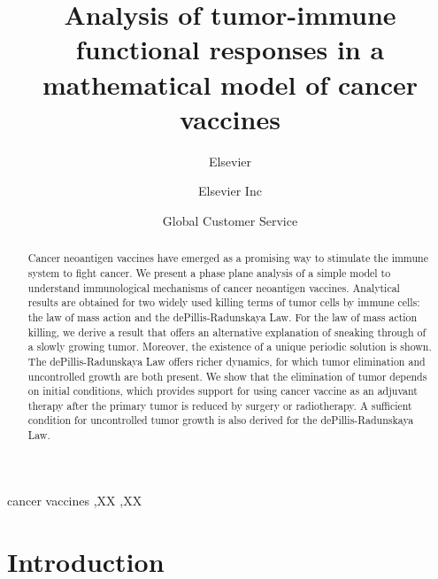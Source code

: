 \documentclass[review,authoryear]{elsarticle}
\begin{document}
\begin{frontmatter}

\title{Analysis of tumor-immune functional responses in a mathematical model
of cancer vaccines}


\author{Elsevier}
\address{Radarweg 29, Amsterdam}

\author[mymainaddress,mysecondaryaddress]{Elsevier Inc}

\author[mysecondaryaddress]{Global Customer Service}

\address[mymainaddress]{1600 John F Kennedy Boulevard, Philadelphia}
\address[mysecondaryaddress]{360 Park Avenue South, New York}

\begin{abstract}
Cancer neoantigen vaccines have emerged as a promising way to stimulate
the immune system to fight cancer. We present a phase plane analysis
of a simple model to understand immunological mechanisms of
cancer neoantigen vaccines. Analytical results are obtained for
two widely used killing terms of tumor cells by immune cells:
the law of mass action and the dePillis-Radunskaya Law. For the law
of mass action killing, we derive a result that offers an alternative
explanation of sneaking through of a slowly growing tumor. Moreover,
the existence of a unique periodic solution is shown. The dePillis-Radunskaya
Law offers richer dynamics, for which tumor elimination and uncontrolled growth are both present. We show that the elimination of tumor depends
on initial conditions, which provides support for using cancer vaccine
as an adjuvant therapy after the primary tumor is reduced by surgery
or radiotherapy. A sufficient condition for uncontrolled tumor growth 
is also derived for the dePillis-Radunskaya Law. 
\end{abstract}

\begin{keyword}
cancer vaccines \sep XX \sep XX
\end{keyword}

\end{frontmatter}

\linenumbers

\section{Introduction}
\end{document}
